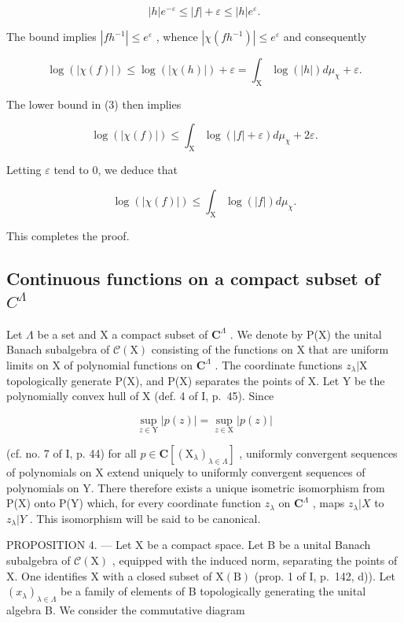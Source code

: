 \[
| h | e ^ {- \varepsilon} \leqslant | f | + \varepsilon \leqslant | h | e ^ {\varepsilon}.\tag{3}
\]

The bound implies \(|fh^{-1}| \leqslant e^{\varepsilon}\) , whence \(|\chi (fh^{-1})| \leqslant e^{\varepsilon}\) and consequently

\[
\log (| \chi (f) |) \leqslant \log (| \chi (h) |) + \varepsilon = \int_ {\mathrm{X}} \log (| h |) d \mu_ {\chi} + \varepsilon .\tag{4}
\]

The lower bound in (3) then implies

\[
\log (| \chi (f) |) \leqslant \int_ {\mathrm{X}} \log (| f | + \varepsilon) d \mu_ {\chi} + 2 \varepsilon .
\]

Letting \(\varepsilon\) tend to 0, we deduce that

\[
\log (| \chi (f) |) \leqslant \int_ {\mathrm{X}} \log (| f |) d \mu_ {\chi}.
\]

This completes the proof.

\subsection{\texorpdfstring{Continuous functions on a compact subset of \(C^{\Lambda}\)}{Continuous functions on a compact subset of C\^{}\{Lambda\}}}

Let \(\Lambda\) be a set and X a compact subset of \(\mathbf{C}^{\Lambda}\) . We denote by P(X) the unital Banach subalgebra of \(\mathcal{C}(\mathrm{X})\) consisting of the functions on X that are uniform limits on X of polynomial functions on \(\mathbf{C}^{\Lambda}\) . The coordinate functions \(z_{\lambda}|\mathrm{X}\) topologically generate P(X), and P(X) separates the points of X. Let Y be the polynomially convex hull of X (def. 4 of I, p.~45). Since

\[
\sup _ {z \in \mathrm{Y}} | p (z) | = \sup _ {z \in \mathrm{X}} | p (z) |
\]

(cf. no. 7 of I, p. 44) for all \(p \in \mathbf{C}[(\mathrm{X}_{\lambda})_{\lambda \in \Lambda}]\) , uniformly convergent sequences of polynomials on X extend uniquely to uniformly convergent sequences of polynomials on Y. There therefore exists a unique isometric isomorphism from P(X) onto P(Y) which, for every coordinate function \(z_{\lambda}\) on \(\mathbf{C}^{\Lambda}\) , maps \(z_{\lambda}|X\) to \(z_{\lambda}|Y\) . This isomorphism will be said to be canonical.

PROPOSITION 4. — Let X be a compact space. Let B be a unital Banach subalgebra of \(\mathcal{C}(\mathrm{X})\) , equipped with the induced norm, separating the points of X. One identifies X with a closed subset of \(\mathrm{X(B)}\) (prop. 1 of I, p.~142, d)). Let \((x_{\lambda})_{\lambda \in \Lambda}\) be a family of elements of B topologically generating the unital algebra B. We consider the commutative diagram


